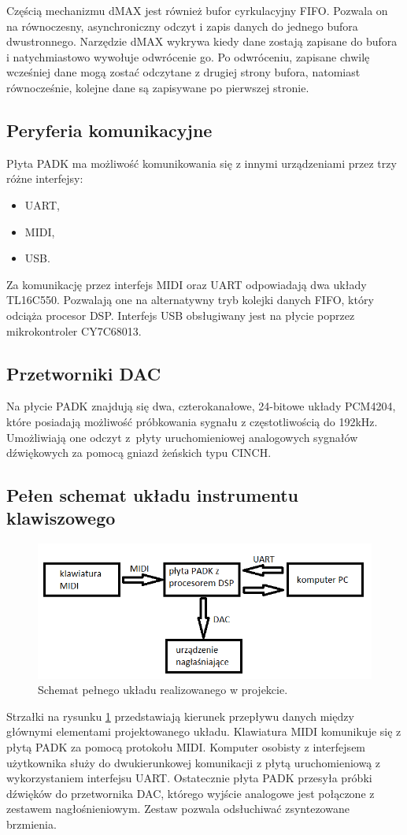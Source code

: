 Częścią mechanizmu dMAX jest również bufor cyrkulacyjny FIFO. Pozwala on na równoczesny, asynchroniczny odczyt i zapis danych do jednego bufora dwustronnego. Narzędzie dMAX wykrywa kiedy dane zostają zapisane do bufora i natychmiastowo wywołuje odwrócenie go. Po odwróceniu, zapisane chwilę wcześniej dane mogą zostać odczytane z drugiej strony bufora, natomiast równocześnie, kolejne dane są zapisywane po pierwszej stronie.

\subsection{Peryferia komunikacyjne}
Płyta PADK ma możliwość komunikowania się z innymi urządzeniami przez trzy różne interfejsy:
\begin{itemize}
	\item UART,
	\item MIDI,
	\item USB.
\end{itemize}
Za komunikację przez interfejs MIDI oraz UART odpowiadają dwa układy TL16C550. Pozwalają one na alternatywny tryb kolejki danych FIFO, który odciąża procesor DSP. Interfejs USB obsługiwany jest na płycie poprzez mikrokontroler CY7C68013.

\subsection{Przetworniki DAC}
Na płycie PADK znajdują się dwa, czterokanałowe, 24-bitowe układy PCM4204, które posiadają możliwość próbkowania sygnału z częstotliwością do 192kHz. Umożliwiają one odczyt z~płyty uruchomieniowej analogowych sygnałów dźwiękowych za pomocą gniazd żeńskich typu CINCH.

\subsection{Pełen schemat układu instrumentu klawiszowego}
\begin{figure}[H]
	\centering
	\includegraphics[width=12cm]{./grafiki/real_pelen_uklad}
	\captionsetup{justification=centering}
	\caption{Schemat pełnego układu realizowanego w projekcie.}
	\label{rys:real_uklad}
\end{figure}
Strzałki na rysunku \ref{rys:real_uklad} przedstawiają kierunek przepływu danych między głównymi elementami projektowanego układu. Klawiatura MIDI komunikuje się z płytą PADK za pomocą protokołu MIDI. Komputer osobisty z interfejsem użytkownika służy do dwukierunkowej komunikacji z płytą uruchomieniową z wykorzystaniem interfejsu UART. Ostatecznie płyta PADK przesyła próbki dźwięków do przetwornika DAC, którego wyjście analogowe jest połączone z zestawem nagłośnieniowym. Zestaw pozwala odsłuchiwać zsyntezowane brzmienia.

